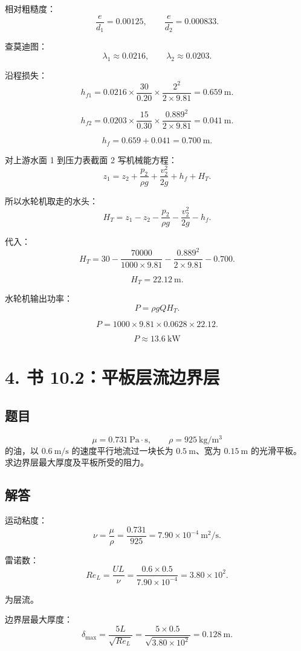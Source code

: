 \documentclass[11pt,a4paper]{ctexart}
\begin{document}
相对粗糙度：
\[
\frac{e}{d_1}=0.00125,\qquad
\frac{e}{d_2}=0.000833.
\]

查莫迪图：
\[
\lambda_1\approx0.0216,\qquad
\lambda_2\approx0.0203.
\]

沿程损失：
\[
h_{f1}
=0.0216\times\frac{30}{0.20}\times\frac{2^2}{2\times9.81}
=0.659\ \mathrm{m}.
\]

\[
h_{f2}
=0.0203\times\frac{15}{0.30}\times\frac{0.889^2}{2\times9.81}
=0.041\ \mathrm{m}.
\]

\[
h_f=0.659+0.041=0.700\ \mathrm{m}.
\]

对上游水面 1 到压力表截面 2 写机械能方程：
\[
z_1=z_2+\frac{p_2}{\rho g}+\frac{v_2^2}{2g}+h_f+H_T.
\]

所以水轮机取走的水头：
\[
H_T=z_1-z_2-\frac{p_2}{\rho g}-\frac{v_2^2}{2g}-h_f.
\]

代入：
\[
H_T=30-\frac{70000}{1000\times9.81}
-\frac{0.889^2}{2\times9.81}
-0.700.
\]

\[
H_T=22.12\ \mathrm{m}.
\]

水轮机输出功率：
\[
P=\rho gQH_T.
\]

\[
P=1000\times9.81\times0.0628\times22.12.
\]

\[
\boxed{P\approx13.6\ \mathrm{kW}}
\]

\section*{4. 书 10.2：平板层流边界层}

\subsection*{题目}

\[
\mu=0.731\ \mathrm{Pa\cdot s},\qquad \rho=925\ \mathrm{kg/m^3}
\]
的油，以 \(0.6\ \mathrm{m/s}\) 的速度平行地流过一块长为 \(0.5\ \mathrm{m}\)、宽为 \(0.15\ \mathrm{m}\) 的光滑平板。求边界层最大厚度及平板所受的阻力。

\subsection*{解答}

运动粘度：
\[
\nu=\frac{\mu}{\rho}=\frac{0.731}{925}
=7.90\times10^{-4}\ \mathrm{m^2/s}.
\]

雷诺数：
\[
Re_L=\frac{UL}{\nu}
=\frac{0.6\times0.5}{7.90\times10^{-4}}
=3.80\times10^2.
\]

为层流。

边界层最大厚度：
\[
\delta_{\max}=\frac{5L}{\sqrt{Re_L}}
=\frac{5\times0.5}{\sqrt{3.80\times10^2}}
=0.128\ \mathrm{m}.
\]
\end{document}
